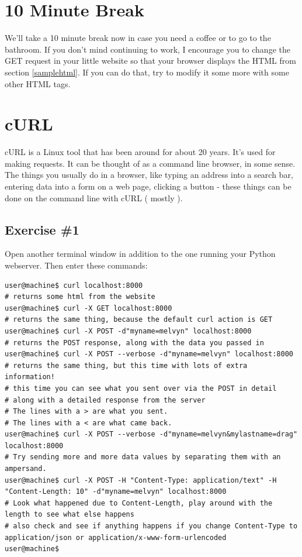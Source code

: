 \documentclass[10pt]{article}
\begin{document}
\section{10 Minute Break}
We'll take a 10 minute break now in case you need a coffee or to go to the bathroom. If you don't mind continuing to work, I encourage you to change the GET request in your little website so that your browser displays the HTML from section \ref{samplehtml}. If you can do that, try to modify it some more with some other HTML tags.

\section{cURL}
cURL is a Linux tool that has been around for about 20 years. It's used for making requests. It can be thought of as a command line browser, in some sense. The things you usually do  in a browser, like typing an address into a search bar, entering data into a form on a web page, clicking a button - these things can be done on the command line with cURL ( mostly ).

\subsection{Exercise \#1}
Open another terminal window in addition to the one running your Python webserver. Then enter these commands:

\begin{lstlisting}
user@machine$ curl localhost:8000
# returns some html from the website
user@machine$ curl -X GET localhost:8000
# returns the same thing, because the default curl action is GET
user@machine$ curl -X POST -d"myname=melvyn" localhost:8000
# returns the POST response, along with the data you passed in
user@machine$ curl -X POST --verbose -d"myname=melvyn" localhost:8000
# returns the same thing, but this time with lots of extra information!
# this time you can see what you sent over via the POST in detail
# along with a detailed response from the server
# The lines with a > are what you sent.
# The lines with a < are what came back.
user@machine$ curl -X POST --verbose -d"myname=melvyn&mylastname=drag" localhost:8000
# Try sending more and more data values by separating them with an ampersand.
user@machine$ curl -X POST -H "Content-Type: application/text" -H "Content-Length: 10" -d"myname=melvyn" localhost:8000
# Look what happened due to Content-Length, play around with the length to see what else happens
# also check and see if anything happens if you change Content-Type to application/json or application/x-www-form-urlencoded
user@machine$
\end{lstlisting}
\end{document}
